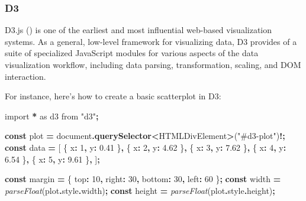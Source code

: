 \documentclass[
]{book}
\newenvironment{Shaded}{\begin{snugshade}}{\end{snugshade}}
\newcommand{\AttributeTok}[1]{\textcolor[rgb]{0.13,0.29,0.53}{#1}}
\newcommand{\BuiltInTok}[1]{#1}
\newcommand{\DataTypeTok}[1]{\textcolor[rgb]{0.13,0.29,0.53}{#1}}
\newcommand{\DecValTok}[1]{\textcolor[rgb]{0.00,0.00,0.81}{#1}}
\newcommand{\FloatTok}[1]{\textcolor[rgb]{0.00,0.00,0.81}{#1}}
\newcommand{\FunctionTok}[1]{\textcolor[rgb]{0.13,0.29,0.53}{\textbf{#1}}}
\newcommand{\ImportTok}[1]{#1}
\newcommand{\KeywordTok}[1]{\textcolor[rgb]{0.13,0.29,0.53}{\textbf{#1}}}
\newcommand{\NormalTok}[1]{#1}
\newcommand{\OperatorTok}[1]{\textcolor[rgb]{0.81,0.36,0.00}{\textbf{#1}}}
\newcommand{\PreprocessorTok}[1]{\textcolor[rgb]{0.56,0.35,0.01}{\textit{#1}}}
\newcommand{\StringTok}[1]{\textcolor[rgb]{0.31,0.60,0.02}{#1}}
\theoremstyle{definition}
\theoremstyle{definition}
\theoremstyle{definition}
\theoremstyle{definition}
\theoremstyle{remark}
\begin{document}
\subsubsection{D3}\label{d3}

D3.js () is one of the earliest and most influential web-based visualization systems. As a general, low-level framework for visualizing data, D3 provides of a suite of specialized JavaScript modules for various aspects of the data visualization workflow, including data parsing, transformation, scaling, and DOM interaction.

For instance, here's how to create a basic scatterplot in D3:

\begin{Shaded}
\begin{Highlighting}[]
\ImportTok{import} \OperatorTok{*} \ImportTok{as}\NormalTok{ d3 }\ImportTok{from} \StringTok{"d3"}\OperatorTok{;}

\KeywordTok{const}\NormalTok{ plot }\OperatorTok{=} \BuiltInTok{document}\OperatorTok{.}\FunctionTok{querySelector}\OperatorTok{\textless{}}\BuiltInTok{HTMLDivElement}\OperatorTok{\textgreater{}}\NormalTok{(}\StringTok{"\#d3{-}plot"}\NormalTok{)}\OperatorTok{!;}
\KeywordTok{const}\NormalTok{ data }\OperatorTok{=}\NormalTok{ [}
\NormalTok{  \{ }\DataTypeTok{x}\OperatorTok{:} \DecValTok{1}\OperatorTok{,} \DataTypeTok{y}\OperatorTok{:} \FloatTok{0.41}\NormalTok{ \}}\OperatorTok{,}
\NormalTok{  \{ }\DataTypeTok{x}\OperatorTok{:} \DecValTok{2}\OperatorTok{,} \DataTypeTok{y}\OperatorTok{:} \FloatTok{4.62}\NormalTok{ \}}\OperatorTok{,}
\NormalTok{  \{ }\DataTypeTok{x}\OperatorTok{:} \DecValTok{3}\OperatorTok{,} \DataTypeTok{y}\OperatorTok{:} \FloatTok{7.62}\NormalTok{ \}}\OperatorTok{,}
\NormalTok{  \{ }\DataTypeTok{x}\OperatorTok{:} \DecValTok{4}\OperatorTok{,} \DataTypeTok{y}\OperatorTok{:} \FloatTok{6.54}\NormalTok{ \}}\OperatorTok{,}
\NormalTok{  \{ }\DataTypeTok{x}\OperatorTok{:} \DecValTok{5}\OperatorTok{,} \DataTypeTok{y}\OperatorTok{:} \FloatTok{9.61}\NormalTok{ \}}\OperatorTok{,}
\NormalTok{]}\OperatorTok{;}

\KeywordTok{const}\NormalTok{ margin }\OperatorTok{=}\NormalTok{ \{ }\DataTypeTok{top}\OperatorTok{:} \DecValTok{10}\OperatorTok{,} \DataTypeTok{right}\OperatorTok{:} \DecValTok{30}\OperatorTok{,} \DataTypeTok{bottom}\OperatorTok{:} \DecValTok{30}\OperatorTok{,} \DataTypeTok{left}\OperatorTok{:} \DecValTok{60}\NormalTok{ \}}\OperatorTok{;}
\KeywordTok{const}\NormalTok{ width }\OperatorTok{=} \PreprocessorTok{parseFloat}\NormalTok{(plot}\OperatorTok{.}\AttributeTok{style}\OperatorTok{.}\AttributeTok{width}\NormalTok{)}\OperatorTok{;}
\KeywordTok{const}\NormalTok{ height }\OperatorTok{=} \PreprocessorTok{parseFloat}\NormalTok{(plot}\OperatorTok{.}\AttributeTok{style}\OperatorTok{.}\AttributeTok{height}\NormalTok{)}\OperatorTok{;}


\end{Highlighting}
\end{Shaded}
\end{document}
